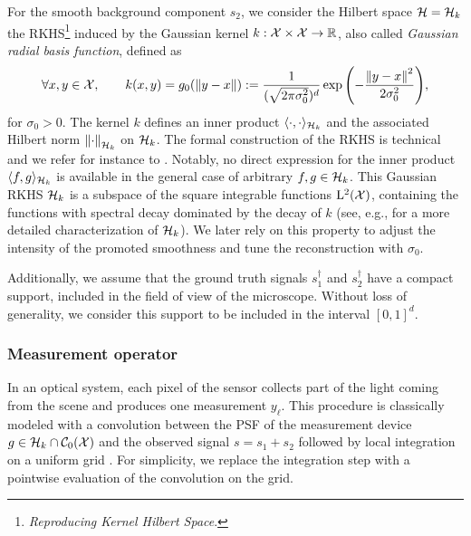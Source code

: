 \documentclass[12pt]{article}
\begin{document}

            For the smooth background component $s_2$, we consider the Hilbert space $\mathcal{H} = \mathcal{H}_k$ the RKHS\footnote{\textit{Reproducing Kernel Hilbert Space}.} induced by the Gaussian kernel $k: \mathcal{X} \times \mathcal{X} \to \mathbb{R}$, also called \emph{Gaussian radial basis function}, defined as
            \begin{equation*}
                \forall x, y \in \mathcal{X}, \qquad k(x, y) = g_0(\left\lVert y - x\right\rVert) := \frac{1}{(\sqrt{2\pi\sigma_0^2})^d} \exp{ \left({-\frac{\left\lVert y - x\right\rVert^2}{2 \sigma_0^2}}\right)},
            \end{equation*}
            for $\sigma_0 > 0$. The kernel $k$ defines an inner product $\langle \cdot, \cdot \rangle_{\mathcal{H}_k}$ and the associated Hilbert norm $\left\lVert\cdot\right\rVert_{\mathcal{H}_k}$ on $\mathcal{H}_k$. The formal construction of the RKHS is technical and we refer for instance to \cite[Chapter~10]{wendland2004}. Notably, no direct expression for the inner product  $\langle f, g \rangle_{\mathcal{H}_k}$ is available in the general case of arbitrary $f, g \in \mathcal{H}_k$. This Gaussian RKHS $\mathcal{H}_k$ is a subspace of the square integrable functions $\mathrm{L}^2(\mathcal{X})$, containing the functions with spectral decay dominated by the decay of $k$ (see, e.g., \cite{minh2010} for a more detailed characterization of $\mathcal{H}_k$). We later rely on this property to adjust the intensity of the promoted smoothness and tune the reconstruction with $\sigma_0$.

            Additionally, we assume that the ground truth signals $s_1^\dagger$ and $ s_2^\dagger$ have a compact support, included in the field of view of the microscope. Without loss of generality, we consider this support to be included in the interval $[0, 1]^d$. 


        \subsubsection{Measurement operator}        
            In an optical system, each pixel of the sensor collects part of the light coming from the scene and produces one measurement $y_\ell$. This procedure is classically modeled with a convolution between the PSF of the measurement device $g \in \mathcal{H}_k \cap {\mathcal{C}}_0({\mathcal{X}})$ and the observed signal $s = s_1 + s_2$ followed by local integration on a uniform grid \cite{denoyelle2019sliding}. For simplicity, we replace the integration step with a pointwise evaluation of the convolution on the grid.
        
\end{document}
